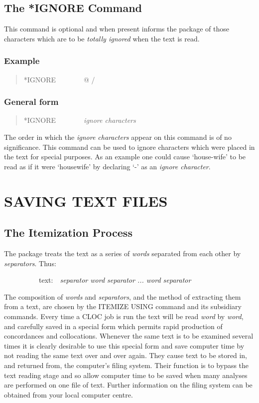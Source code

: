 \subsection{The *IGNORE Command}
This command is optional and when present informs the package of
those characters which are to be {\em totally ignored} when the text is read.

\subsubsection{Example}
\begin{quote}
*IGNORE~~~~~~~~@ /
\end{quote}

\subsubsection{General form}
\begin{quote}
*IGNORE~~~~~~~~{\em ignore characters}
\end{quote}

The order in which the {\em ignore characters} appear on this command
is of no significance.  This command can be used to ignore
characters which were placed in the text for special purposes.  As an
example one could cause `house-wife' to be read as if it were `housewife'
by declaring `-' as an {\em ignore character}.

\section{SAVING TEXT FILES}
\subsection{The Itemization Process}
The package treats the text as a series of {\em words} separated from each
other by {\em separators}.  Thus:

~~~~~~~~~~text:~~{\em separator word separator ... word separator}

The composition of {\em words} and {\em separators},
and the method of extracting
them from a text, are chosen by the ITEMIZE USING command and its
subsidiary commands.  Every time a CLOC job is run the text will be read
{\em word} by {\em word}, and carefully saved in a special form which permits
rapid production of concordances and collocations.  Whenever the same text is
to be examined several times it is clearly desirable to use this special
form and save computer time by not reading the same text over and over
again. They cause text to be stored in, and returned from, the
computer's filing system.  Their function is to bypass the text reading
stage and so allow computer time to be saved when many analyses are
performed on one file of text.  Further information on the filing system
can be obtained from your local computer centre.

